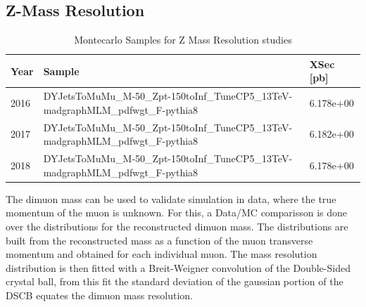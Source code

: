 
\subsection{Z-Mass Resolution}

\begin{table}
\begin{center}
  \caption{Montecarlo Samples for Z Mass Resolution studies}
\footnotesize
\begin{tabular}{|l|l|l|}
\hline
Year & Sample & XSec [pb] \\ \hline
\hline
2016 & DYJetsToMuMu\_M-50\_Zpt-150toInf\_TuneCP5\_13TeV-madgraphMLM\_pdfwgt\_F-pythia8 & 6.178e+00\\
\hline
2017 & DYJetsToMuMu\_M-50\_Zpt-150toInf\_TuneCP5\_13TeV-madgraphMLM\_pdfwgt\_F-pythia8 & 6.182e+00\\
\hline
2018 & DYJetsToMuMu\_M-50\_Zpt-150toInf\_TuneCP5\_13TeV-madgraphMLM\_pdfwgt\_F-pythia8 & 6.178e+00\\
\hline
\end{tabular}
\label{tab:ZMassResolutionSamples}
\end{center}
\end{table}

The dimuon mass can be used to validate simulation in data, where the true momentum
of the muon is unknown. For this, a Data/MC comparisson is done over the
distributions for the reconstructed dimuon mass. The distributions are built
from the reconstructed mass as a function of the muon transverse momentum and
obtained for each individual muon. The mass resolution distribution is then fitted with
a Breit-Weigner convolution of the Double-Sided crystal ball, from this fit the
standard deviation of the gaussian portion of the DSCB equates the dimuon
mass resolution.

